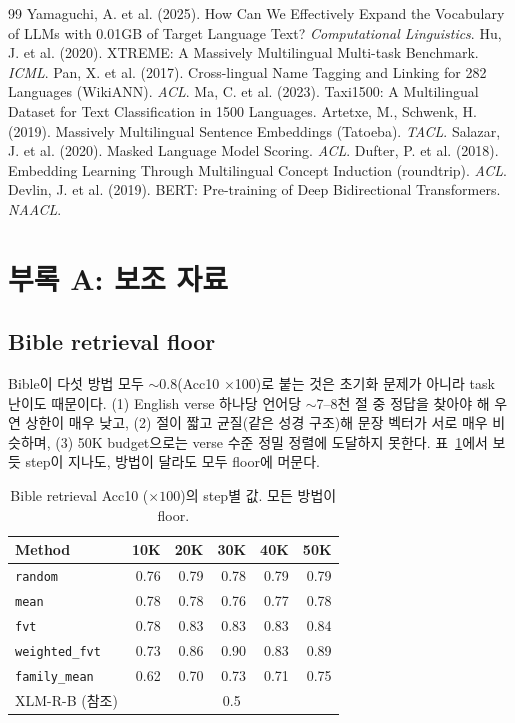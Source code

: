 \documentclass[11pt,a4paper]{article}
\newcommand{\rand}{\texttt{random}}
\newcommand{\meanm}{\texttt{mean}}
\newcommand{\fvt}{\texttt{fvt}}
\newcommand{\wfvt}{\texttt{weighted\_fvt}}
\newcommand{\famm}{\texttt{family\_mean}}
\begin{document}
\begin{thebibliography}{99}
 Yamaguchi, A. et al. (2025). How Can We Effectively Expand the Vocabulary of LLMs with 0.01GB of Target Language Text? \textit{Computational Linguistics}.
 Hu, J. et al. (2020). XTREME: A Massively Multilingual Multi-task Benchmark. \textit{ICML}.
 Pan, X. et al. (2017). Cross-lingual Name Tagging and Linking for 282 Languages (WikiANN). \textit{ACL}.
 Ma, C. et al. (2023). Taxi1500: A Multilingual Dataset for Text Classification in 1500 Languages.
 Artetxe, M., Schwenk, H. (2019). Massively Multilingual Sentence Embeddings (Tatoeba). \textit{TACL}.
 Salazar, J. et al. (2020). Masked Language Model Scoring. \textit{ACL}.
 Dufter, P. et al. (2018). Embedding Learning Through Multilingual Concept Induction (roundtrip). \textit{ACL}.
 Devlin, J. et al. (2019). BERT: Pre-training of Deep Bidirectional Transformers. \textit{NAACL}.
\end{thebibliography}

\appendix

\section{부록 A: 보조 자료}

\subsection{Bible retrieval floor}
Bible이 다섯 방법 모두 $\sim$0.8(Acc10 $\times$100)로 붙는 것은 초기화 문제가 아니라 task 난이도 때문이다. (1) English verse 하나당 언어당 $\sim$7--8천 절 중 정답을 찾아야 해 우연 상한이 매우 낮고, (2) 절이 짧고 균질(같은 성경 구조)해 문장 벡터가 서로 매우 비슷하며, (3) 50K budget으로는 verse 수준 정밀 정렬에 도달하지 못한다. 표~\ref{tab:bible}에서 보듯 step이 지나도, 방법이 달라도 모두 floor에 머문다.

\begin{table}[h]\centering\small
\caption{Bible retrieval Acc10 ($\times100$)의 step별 값. 모든 방법이 floor.}
\label{tab:bible}
\begin{tabular}{@{}lrrrrr@{}}
\toprule
Method & 10K & 20K & 30K & 40K & 50K \\
\midrule
\rand & 0.76 & 0.79 & 0.78 & 0.79 & 0.79 \\
\meanm & 0.78 & 0.78 & 0.76 & 0.77 & 0.78 \\
\fvt & 0.78 & 0.83 & 0.83 & 0.83 & 0.84 \\
\wfvt & 0.73 & 0.86 & 0.90 & 0.83 & 0.89 \\
\famm & 0.62 & 0.70 & 0.73 & 0.71 & 0.75 \\
\midrule
XLM-R-B (참조) & \multicolumn{5}{c}{0.5} \\
\bottomrule
\end{tabular}
\end{table}
\end{document}
